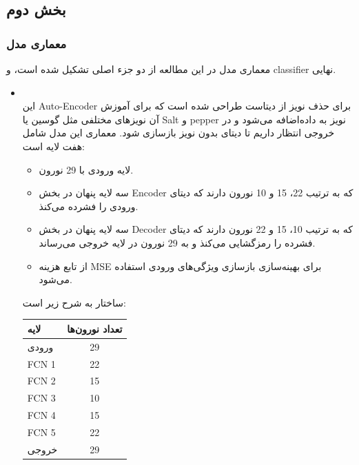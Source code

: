 \documentclass{article}
\begin{document}
\subsection{بخش دوم}

\subsubsection{معماری مدل}

معماری مدل در این مطالعه از دو جزء اصلی تشکیل شده است،
و classifier نهایی.

\begin{itemize}
\item \textbf{}\\
 این Auto-Encoder برای حذف نویز از دیتاست طراحی شده است که برای آموزش آن نویزهای مختلفی مثل گوسین یا 
 Salt و pepper
 نویز به داده‌اضافه می‌شود و در خروجی انتظار داریم تا دیتای بدون نویز بازسازی شود.
معماری این مدل شامل هفت لایه است:
  \begin{itemize}
    \item لایه ورودی با 29 نورون.
    \item سه لایه پنهان در بخش 
    Encoder
     که به ترتیب 22، 15 و 10 نورون دارند که دیتای ورودی را فشرده می‌کنذ.
    \item سه لایه پنهان در بخش 
    Decoder
    که به ترتیب 10، 15 و 22 نورون دارند که دیتای فشرده را رمزگشایی می‌کنذ و به 29 نورون در لایه خروجی می‌رساند.
    \item از تابع هزینه 
    MSE
     برای بهینه‌سازی بازسازی ویژگی‌های ورودی استفاده می‌شود.
  \end{itemize}
    ساختار به شرح زیر است:

    \begin{table}[H]
    \centering
    \begin{tabular}{|l|c|}
    \hline
    \textbf{لایه} & \textbf{تعداد نورون‌ها} \\
    \hline
    ورودی & 29 \\
    FCN 1 & 22 \\
    FCN 2 & 15 \\
    FCN 3 & 10 \\
    FCN 4 & 15 \\
    FCN 5 & 22 \\
    خروجی & 29 \\
    \hline
    \end{tabular}
    \end{table}


\end{itemize}
\end{document}
